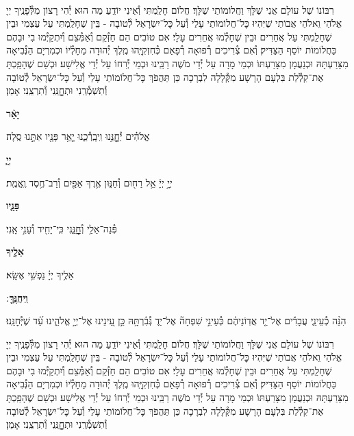 \documentclass[twoside, openany, parskip=half, 11pt]{book}
\begin{document}
\\

רִבּוֹנוֹ שֶׁל עוֹלָם אֲנִי שֶׁלָּךְ וַחֲלוֹמוֹתַי שֶׁלָּךְ׃ חֲלוֹם חָלַֽמְתִּי וְ֯אֵינִי יוֹדֵֽעַ מַה הוּא׃ יְ֯הִי רָצוֹן מִלְּ֯פָנֶֽיךָ יְיָ אֱלֹהַי וֵאלֹהֵי אֲבוֹתַי שֶׁיִּהְיוּ כׇּל־חֲלוֹמוֹתַי עָלַי וְ֯עַל כׇּל־יִשְׂרָאֵל לְ֯טוֹבָה - בֵּין שֶׁחָלַֽמְתִּי עַל עַצְמִי וּבֵין שֶׁחָלַֽמְתִּי עַל אֲחֵרִים וּבֵין שֶׁחָלְ֯מוּ אֲחֵרִים עָלָי׃ אִם טוֹבִים הֵם חַזְּ֯קֵם וְ֯אַמְּ֯צֵם וְ֯יִתְקַיְּ֯מוּ בִי וּבָהֶם כַּחֲלוֹמוֹת יוֹסֵף הַצַּדִּיק׃ וְ֯אִם צְ֯רִיכִים רְ֯פוּאָה רְ֯פָאֵם כְּ֯חִזְקִיָּֽהוּ מֶֽלֶךְ יְ֯הוּדָה מֵחָלְ֯יוֹ וּכְמִרְיָם הַנְּ֯בִיאָה מִצָּרַעְתָּהּ וּכְנַעֲמָן מִצָּרַעְתּוֹ וּכְמֵי מָרָה עַל יְ֯דֵי מֹשֶׁה רַבֵּֽינוּ וּכְמֵי יְ֯רִחוֹ עַל יְ֯דֵי אֱלִישָׁע׃ וּכְשֵׁם שֶׁהָפַֽכְתָּ אֶת־קִלְ֯לַת בִּלְעָם הָרָשָׁע מִקְּ֯לָלָה לִבְרָכָה כֵּן תַּהֲפֹךְ כׇּל־חֲלוֹמוֹתַי עָלַי וְ֯עַל כׇּל־יִשְׂרָאֵל לְ֯טוֹבָה וְ֯תִשְׁמְ֯רֵֽנִי וּתְחׇׇׇׇׇנֵּֽנִי וְ֯תִרְצֵֽנִי׃ אָמֵן׃



\textbf{יָאֵ֨ר}
\hfill \begin{footnotesize}
אֱלֹהִ֗ים יְ֯חׇׇׇׇׇנֵּ֥נוּ וִֽיבָֽרְ֯כֵ֑נוּ יָ֤אֵ֥ר פָּנָ֖יו אִתָּ֣נוּ סֶֽלָה׃\\
\end{footnotesize}
\textbf{יְיָ֧}
\hfill \begin{footnotesize}
יְיָ֣ יְיָ֔ אֵ֥ל רַח֖וּם וְ֯חַנּ֑וּן אֶ֥רֶךְ אַפַּ֖יִם וְ֯רַב־חֶ֥סֶד וֶֽאֱמֶֽת׃\\
\end{footnotesize}
\textbf{פָּנָ֛יו}
\hfill \begin{footnotesize}
פְּ֯נֵה־אֵלַ֥י וְ֯חׇׇׇׇׇׇנֵּ֑נִי כִּֽי־יָחִ֖יד וְ֯עָנִ֣י אָֽנִי׃\\
\end{footnotesize}
\textbf{אֵלֶ֖יךָ}
\hfill \begin{footnotesize}
אֵלֶ֥יךָ יְיָ֗ נַפְשִׁ֥י אֶשָּֽׂא׃\\
\end{footnotesize}
\textbf{וִֽיחֻנֶּֽךָּ}
׃ \hfill \begin{footnotesize}
הִנֵּ֨ה כְ֯עֵינֵ֢י עֲבָדִ֡ים אֶל־יַ֤ד אֲדֽוֹנֵיהֶ֗ם כְּ֯עֵינֵ֣י שִׁפְחָה֘ אֶל־יַד֢ גְּ֯בִ֫רְתָּ֥הּ כֵּ֣ן עֵ֭ינֵינוּ אֶל־יְיָ֣ אֱלֹהֵ֑ינוּ עַ֝֗ד שֶׁיְּ֯חׇנֵּֽנוּ׃
\end{footnotesize}


רִבּוֹנוֹ שֶׁל עוֹלָם אֲנִי שֶׁלָּךְ וַחֲלוֹמוֹתַי שֶׁלָּךְ׃ חֲלוֹם חָלַֽמְתִּי וְ֯אֵינִי יוֹדֵֽעַ מַה הוּא׃ יְ֯הִי רָצוֹן מִלְּ֯פָנֶֽיךָ יְיָ אֱלֹהַי וֵאלֹהֵי אֲבוֹתַי שֶׁיִּהְיוּ כׇּל־חֲלוֹמוֹתַי עָלַי וְ֯עַל כׇּל־יִשְׂרָאֵל לְ֯טוֹבָה - בֵּין שֶׁחָלַֽמְתִּי עַל עַצְמִי וּבֵין שֶׁחָלַֽמְתִּי עַל אֲחֵרִים וּבֵין שֶׁחָלְ֯מוּ אֲחֵרִים עָלָי׃ אִם טוֹבִים הֵם חַזְּ֯קֵם וְ֯אַמְּ֯צֵם וְ֯יִתְקַיְּ֯מוּ בִי וּבָהֶם כַּחֲלוֹמוֹת יוֹסֵף הַצַּדִּיק׃ וְ֯אִם צְ֯רִיכִים רְ֯פוּאָה רְ֯פָאֵם כְּ֯חִזְקִיָּֽהוּ מֶֽלֶךְ יְ֯הוּדָה מֵחָלְ֯יוֹ וּכְמִרְיָם הַנְּ֯בִיאָה מִצָּרַעְתָּהּ וּכְנַעֲמָן מִצָּרַעְתּוֹ וּכְמֵי מָרָה עַל יְ֯דֵי מֹשֶׁה רַבֵּֽינוּ וּכְמֵי יְ֯רִחוֹ עַל יְ֯דֵי אֱלִישָׁע׃ וּכְשֵׁם שֶׁהָפַֽכְתָּ אֶת־קִלְ֯לַת בִּלְעָם הָרָשָׁע מִקְּ֯לָלָה לִבְרָכָה כֵּן תַּהֲפֹךְ כׇּל־חֲלוֹמוֹתַי עָלַי וְ֯עַל כׇּל־יִשְׂרָאֵל לְ֯טוֹבָה וְ֯תִשְׁמְ֯רֵֽנִי וּתְחׇׇׇׇׇנֵּֽנִי וְ֯תִרְצֵֽנִי׃ אָמֵן׃
\end{document}
